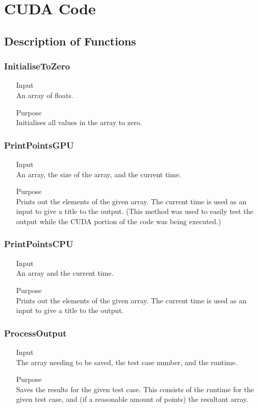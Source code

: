 \documentclass{article}
\begin{document}
\newpage
\section{CUDA Code}
\subsection{Description of Functions}
\subsubsection{InitialiseToZero}
\begin{itemize}
	\item[Input] \hfill\\
	An array of floats.
	\item[Purpose] \hfill\\
	Initialises all values in the array to zero.
\end{itemize}

\subsubsection{PrintPointsGPU}
\begin{itemize}
	\item[Input] \hfill\\
	An array, the size of the array, and the current time.
	\item[Purpose] \hfill\\
	Prints out the elements of the given array. The current time is used as an input to give a title to the output. (This method was used to easily test the output while the CUDA portion of the code was being executed.)
\end{itemize}

\subsubsection{PrintPointsCPU}
\begin{itemize}
	\item[Input] \hfill\\
	An array and the current time.
	\item[Purpose] \hfill\\
	Prints out the elements of the given array. The current time is used as an input to give a title to the output.
\end{itemize}

\subsubsection{ProcessOutput}
\begin{itemize}
	\item[Input] \hfill\\
	The array needing to be saved, the test case number, and the runtime.
	\item[Purpose] \hfill\\
	Saves the results for the given test case. This consists of the runtime for the given test case, and (if a reasonable amount of points) the resultant array.
\end{itemize}
\end{document}
